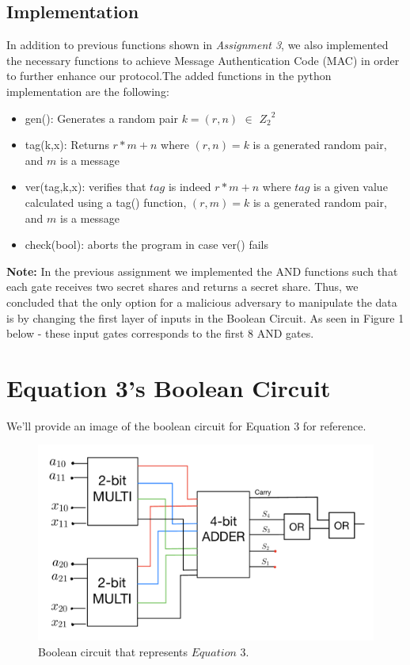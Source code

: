 \documentclass{article}
\begin{document}
\subsection{Implementation}
In addition to previous functions shown in \textit{Assignment 3}, we also implemented the necessary functions to achieve Message Authentication Code (MAC) in order to further enhance our protocol.The added functions in the python implementation are the following:

\begin{itemize}
  \item gen(): 
  Generates a random pair $k=(r,n)$ $\in$ ${Z_2}^{2}$
  \item tag(k,x): Returns $r*m+n$ where $(r,n)=k$ is a generated random pair, and $m$ is a message
  \item ver(tag,k,x): verifies that $tag$ is indeed $r*m+n$ where $tag$ is a given value calculated using a tag() function, $(r,m)=k$ is a generated random pair, and $m$ is a message
  \item check(bool): aborts the program in case ver() fails

\end{itemize}

\textbf{Note:} In the previous assignment we implemented the AND functions such that each gate receives two secret shares and returns a secret share. Thus, we concluded that the only option for a malicious adversary to manipulate the data is by changing the first layer of inputs in the Boolean Circuit. As seen in Figure 1 below - these input gates corresponds to the first 8 AND gates.

  
\section{Equation 3's Boolean Circuit}
We'll provide an image of the boolean circuit for Equation 3 for reference.
\begin{figure}[H]
    \centering
    \includegraphics[width=1\linewidth]{FinalBooleanCircuit.jpeg}
    \caption{Boolean circuit that represents $Equation$ $3$.}
    \label{fig:enter-label}
\end{figure}
\end{document}
